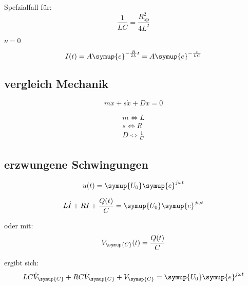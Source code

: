         Spefzialfall für:
        \begin{equation}
            \frac{1}{LC} = \frac{R^2_{\text{ap}}}{4L^2} \nonumber
        \end{equation}

        $\nu = 0$

        \begin{equation}
            I(t) = A \symup{e}^{-\frac{R}{2L}t} = A \symup{e}^{-\frac{t}{LC}} \nonumber
        \end{equation}

        \subsection{vergleich Mechanik}

        \begin{equation}
            m \ddot{x} + s \dot{x} + Dx = 0 \nonumber
        \end{equation}

        \begin{align}
            m \Leftrightarrow L  \nonumber\\
            s \Leftrightarrow R  \nonumber\\
            D \Leftrightarrow \frac{1}{C} \nonumber
        \end{align}

    \subsection{erzwungene Schwingungen}

    \begin{equation}
        u(t)= \symup{U_0} \symup{e}^{j \omega t} \nonumber
    \end{equation}

    \begin{equation}
        L \dot{I} + R I + \frac{Q(t)}{C} = \symup{U_0} \symup{e}^{j \omega t} \nonumber
    \end{equation}

    oder mit:
    \begin{equation}
        V_{\symup{C}} (t) = \frac{Q(t)}{C} \nonumber
    \end{equation}

    ergibt sich:
    \begin{equation}
        LC \ddot{V}_{\symup{C}} + RC \dot{V}_{\symup{C}} + V_{\symup{C}} = \symup{U_0} \symup{e}^{j \omega t} \nonumber
    \end{equation}

